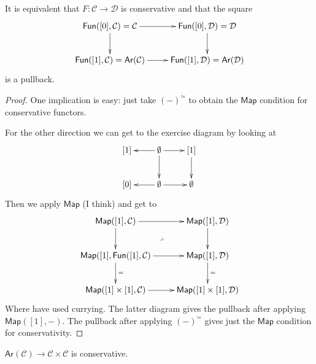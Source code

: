 \begin{proposition}
\label{proposition-chara-conse}
It is equivalent that $F:\mathcal{C} \to
\mathcal{D}$
is conservative and that the square
$$
\xymatrix{
\mathsf{Fun}([0],\mathcal{C})=\mathcal{C}
\ar[r]\ar[d]&
\mathsf{Fun}([0],\mathcal{D})=\mathcal{D}
\ar[d]\\
\mathsf{Fun}([1],\mathcal{C})=\mathsf{Ar}
(\mathcal{C})\ar[r]
&\mathsf{Fun}([1],\mathcal{D})=\mathsf{Ar}
(\mathcal{D})
}
$$
is a pullback.
\end{proposition}

\begin{proof}
One implication is easy: just take
$(-)^\simeq$ to obtain the $\mathsf{Map}$
condition
for conservative functors.

For the other direction we can get to
the exercise diagram by looking at
$$
\xymatrix{
[1]&\emptyset\ar[l]\ar[r]\ar[d]& [1]\ar[d]\\
[0]&\emptyset\ar[l]\ar[r]&\emptyset
}
$$
Then we apply $\mathsf{Map}$ (I think) and
get to
$$
\xymatrix{
\mathsf{Map}([1],\mathcal{C})\ar[r]\ar[d]
\ar@{}[dr]|-{\lrcorner}&
\mathsf{Map}([1],\mathcal{D})\ar[d]\\
\mathsf{Map}([1],\mathsf{Fun}([1],\mathcal{C}
)\ar[r]\ar[d]^{=}&
\mathsf{Map}([1],\mathcal{D})\ar[d]^=\\
\mathsf{Map}([1]\times[1],\mathcal{C})\ar[r]&
\mathsf{Map}([1]\times[1],\mathcal{D})
}
$$
Where have used currying.
The latter diagram gives the pullback
after applying $\mathsf{Map}([1],-)$.
The pullback after applying $(-)^\simeq$
gives just the $\mathsf{Map}$ condition
for conservativity.
\end{proof}

\begin{proposition}
\label{proposition-arrow-funct-conse}
$\mathsf{Ar}(\mathcal{C})\to \mathcal{C}
\times \mathcal{C}$
is conservative.
\end{proposition}

